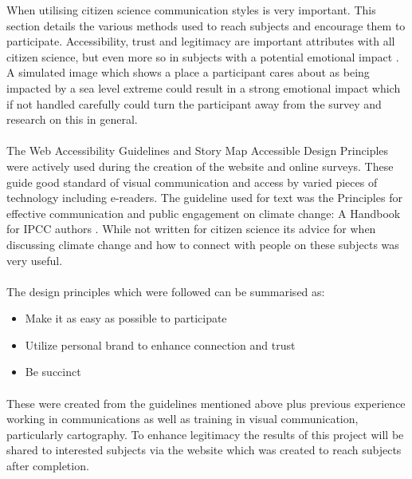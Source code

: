 When utilising citizen science communication styles is very important. This section details the various methods used to reach subjects and encourage them to participate. Accessibility, trust and legitimacy are important attributes with all citizen science, but even more so in subjects with a potential emotional impact \cite{tweddle_guide_2012}. A simulated image which shows a place a participant cares about as being impacted by a sea level extreme could result in a strong emotional impact which if not handled carefully could turn the participant away from the survey and research on this in general.
\paragraph{}

The Web Accessibility Guidelines \cite{henry_web_2022} and Story Map Accessible Design Principles \cite{todd_liz_getting_nodate} were actively used during the creation of the website and online surveys. These guide good standard of visual communication and access by varied pieces of technology including e-readers. The guideline used for text  was the Principles for effective communication and public engagement on	climate change: A Handbook for IPCC authors \cite{corner_a_principles_2018}. While not written for citizen science its advice for when discussing climate change and how to connect with people on these subjects was very useful. 
\paragraph{}

The design principles which were followed can be summarised as:
\begin{itemize}
    \item Make it as easy as possible to participate
    \item Utilize personal brand to enhance connection and trust
    \item Be succinct
\end{itemize}
\paragraph{}
These were created from the guidelines mentioned above plus previous experience working in communications as well as training in visual communication, particularly cartography. To enhance legitimacy the results of this project will be shared to interested subjects via the website which was created to reach subjects after completion. 
